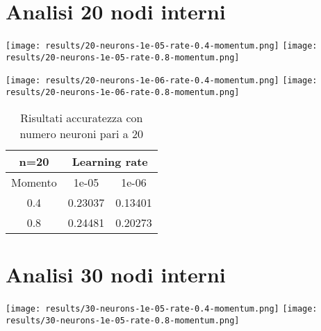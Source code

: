 \section{Analisi 20 nodi interni}
\begin{center}
\texttt{[image: results/20-neurons-1e-05-rate-0.4-momentum.png]}
\texttt{[image: results/20-neurons-1e-05-rate-0.8-momentum.png]}
\end{center}

\begin{center}
\texttt{[image: results/20-neurons-1e-06-rate-0.4-momentum.png]}
\texttt{[image: results/20-neurons-1e-06-rate-0.8-momentum.png]}
\end{center}
\begin{table}[htbp]
    \centering
    \begin{tabular}{|c|c|c|}
    \hline
    n=20 & \multicolumn{2}{c|}{Learning rate} \\
    \hline
    Momento & 1e-05 & 1e-06 \\
    \hline
    0.4 & 0.23037 & 0.13401 \\
    \hline
    0.8 & 0.24481 & 0.20273 \\
    \hline
    \end{tabular}
    \caption{Risultati accuratezza con numero neuroni pari a 20}
\end{table}

\section{Analisi 30 nodi interni}
\begin{center}
\texttt{[image: results/30-neurons-1e-05-rate-0.4-momentum.png]}
\texttt{[image: results/30-neurons-1e-05-rate-0.8-momentum.png]}
\end{center}

